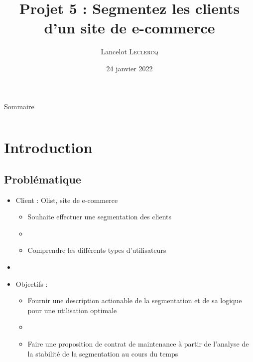 \documentclass[8pt,aspectratio=169,hyperref={unicode=true}]{beamer}
\title[Segmentez les clients d'un site de e-commerce]
{Projet 5 : Segmentez les clients d'un site de e-commerce}
\author[Lancelot \textsc{Leclercq}]{Lancelot \textsc{Leclercq}}
\institute[]{}
\date[]{\small{24 janvier 2022}}
\begin{document}
\begin{frame}[plain]
    \titlepage
\end{frame}

\begin{frame}{Sommaire}
    \Large
    \begin{columns}
        \begin{column}{.7\textwidth}
            \tableofcontents[hideallsubsections]
        \end{column}
    \end{columns}
\end{frame}


\section{Introduction}
\subsection{Problématique}
\begin{frame}{\insertsubsection}
    \begin{itemize}
        \item Client : Olist, site de e-commerce
              \begin{itemize}
                  \item Souhaite effectuer une segmentation des clients
                  \item[]
                  \item Comprendre les différents types d'utilisateurs
              \end{itemize}
        \item[]
        \item Objectifs :
              \begin{itemize}
                  \item Fournir une description actionable de la segmentation et de sa logique pour une utilisation optimale
                  \item[]
                  \item Faire une proposition de contrat de maintenance à partir de l'analyse de la stabilité de la segmentation au cours du temps
              \end{itemize}
    \end{itemize}
\end{frame}
\end{document}
